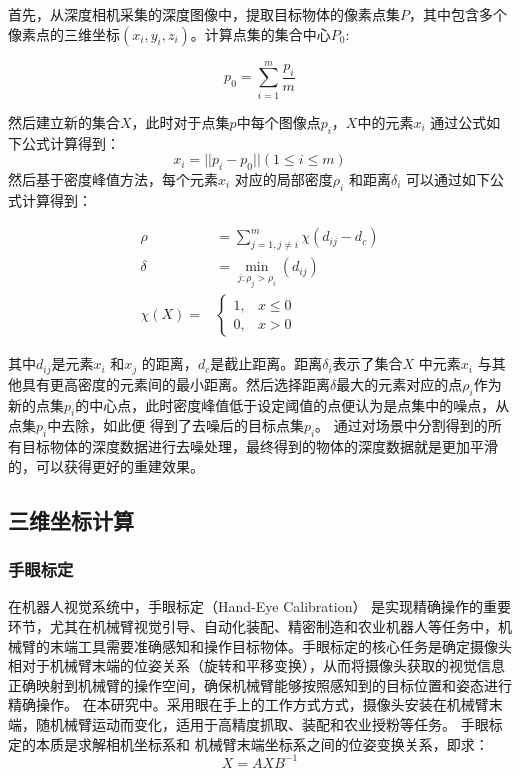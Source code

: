 首先，从深度相机采集的深度图像中，提取目标物体的像素点集$P$，其中包含多个像素点的三维坐标$(x_{i},y_{i},z_{i})$。计算点集的集合中心$P_{0}$:

\begin{equation}
	\label{equ:noise}
	p_{0} = \sum_{i=1}^{m}\frac{p_{i}}{m}
\end{equation}

然后建立新的集合$X$，此时对于点集$p$中每个图像点$p_{i}$，$𝑋$中的元素$x_{i}$ 通过公式如下公式计算得到：
\begin{equation}
	\label{equ:noise2}
	x_{i} = || p_{i} - p_{0}|| (1 \le i \le m)
\end{equation}
然后基于密度峰值方法，每个元素$𝑥_{i}$ 对应的局部密度$\rho_{i}$ 和距离$\delta_{i}$ 可以通过如下公式计算得到：

\begin{equation}
	\label{equ:noise3}
	\begin{split}
		\rho &= \sum_{j=1,j \neq i}^{m} \chi(d_{ij} - d_{c}) \\
		\delta &= \min_{j:\rho_{j}>\rho_{i}}(d_{ij}) \\
		\chi(X) = &
		\begin{cases}
			1, & x \le 0 \\
			0, & x > 0
		\end{cases}
	\end{split}
\end{equation}

其中$d_{ij}$是元素$x_{i}$ 和$x_{j}$ 的距离，$d_{c}$是截止距离。距离$\delta_{i}$表示了集合$X$ 中元素$x_{i}$ 与其他具有更高密度的元素间的最小距离。然后选择距离$\delta$最大的元素对应的点$\rho_{i}$作为新的点集$p_{i}$的中心点，此时密度峰值低于设定阈值的点便认为是点集中的噪点，从点集$p_{i}$中去除，如此便
得到了去噪后的目标点集$p_{i}$。
通过对场景中分割得到的所有目标物体的深度数据进行去噪处理，最终得到的物体的深度数据就是更加平滑的，可以获得更好的重建效果。




\subsection{三维坐标计算}

\subsubsection{手眼标定}

在机器人视觉系统中，手眼标定（Hand-Eye Calibration） 是实现精确操作的重要环节，尤其在机械臂视觉引导、自动化装配、精密制造和农业机器人等任务中，机械臂的末端工具需要准确感知和操作目标物体。手眼标定的核心任务是确定摄像头相对于机械臂末端的位姿关系（旋转和平移变换），从而将摄像头获取的视觉信息正确映射到机械臂的操作空间，确保机械臂能够按照感知到的目标位置和姿态进行精确操作。
在本研究中。采用眼在手上的工作方式方式，摄像头安装在机械臂末端，随机械臂运动而变化，适用于高精度抓取、装配和农业授粉等任务。
手眼标定的本质是求解相机坐标系和 机械臂末端坐标系之间的位姿变换关系，即求：
\begin{equation}
	\label{equ:hand-in-eye}
	X = AXB^{-1}
\end{equation}

